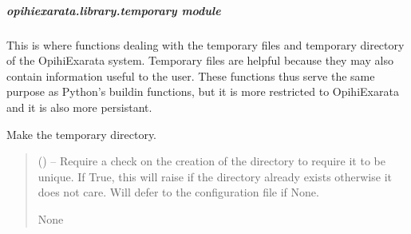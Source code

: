 \documentclass[letterpaper,11pt,english]{sphinxmanual}
\begin{document}
\sphinxstepscope


\subparagraph{opihiexarata.library.temporary module}
\label{\detokenize{code/opihiexarata.library.temporary:module-opihiexarata.library.temporary}}\label{\detokenize{code/opihiexarata.library.temporary:opihiexarata-library-temporary-module}}\label{\detokenize{code/opihiexarata.library.temporary::doc}}
\sphinxAtStartPar
This is where functions dealing with the temporary files and temporary
directory of the OpihiExarata system. Temporary files are helpful because they
may also contain information useful to the user. These functions thus serve the
same purpose as Python’s build\sphinxhyphen{}in functions, but it is more restricted to
OpihiExarata and it is also more persistant.

\begin{savenotes}\begin{fulllineitems}
\label{\detokenize{code/opihiexarata.library.temporary:opihiexarata.library.temporary.create_temporary_directory}}
\pysigstartsignatures
{}
\pysigstopsignatures
\sphinxAtStartPar
Make the temporary directory.
\begin{quote}\begin{description}
\sphinxAtStartPar
{} (\sphinxstyleliteralemphasis{\sphinxupquote{, }}) – Require a check on the creation of the directory to require it to be
unique. If True, this will raise if the directory already exists
otherwise it does not care. Will defer to the configuration file
if None.

\sphinxAtStartPar
None

\end{description}\end{quote}

\end{fulllineitems}\end{savenotes}
\end{document}
